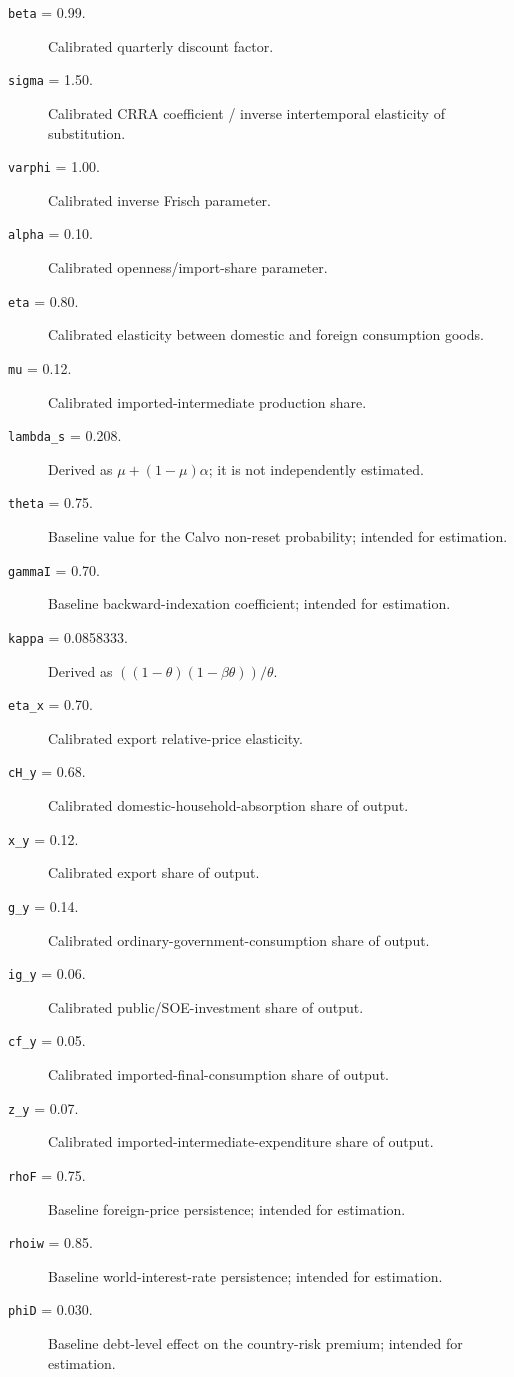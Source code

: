 \begin{description}
\item[\texttt{beta} = 0.99.] Calibrated quarterly discount factor.
\item[\texttt{sigma} = 1.50.] Calibrated CRRA coefficient / inverse intertemporal elasticity of substitution.
\item[\texttt{varphi} = 1.00.] Calibrated inverse Frisch parameter.
\item[\texttt{alpha} = 0.10.] Calibrated openness/import-share parameter.
\item[\texttt{eta} = 0.80.] Calibrated elasticity between domestic and foreign consumption goods.
\item[\texttt{mu} = 0.12.] Calibrated imported-intermediate production share.
\item[\texttt{lambda\_s} = 0.208.] Derived as \(\mu+(1-\mu)\alpha\); it is not independently estimated.
\item[\texttt{theta} = 0.75.] Baseline value for the Calvo non-reset probability; intended for estimation.
\item[\texttt{gammaI} = 0.70.] Baseline backward-indexation coefficient; intended for estimation.
\item[\texttt{kappa} = 0.0858333.] Derived as \(((1-\theta)(1-\beta\theta))/\theta\).
\item[\texttt{eta\_x} = 0.70.] Calibrated export relative-price elasticity.
\item[\texttt{cH\_y} = 0.68.] Calibrated domestic-household-absorption share of output.
\item[\texttt{x\_y} = 0.12.] Calibrated export share of output.
\item[\texttt{g\_y} = 0.14.] Calibrated ordinary-government-consumption share of output.
\item[\texttt{ig\_y} = 0.06.] Calibrated public/SOE-investment share of output.
\item[\texttt{cf\_y} = 0.05.] Calibrated imported-final-consumption share of output.
\item[\texttt{z\_y} = 0.07.] Calibrated imported-intermediate-expenditure share of output.
\item[\texttt{rhoF} = 0.75.] Baseline foreign-price persistence; intended for estimation.
\item[\texttt{rhoiw} = 0.85.] Baseline world-interest-rate persistence; intended for estimation.
\item[\texttt{phiD} = 0.030.] Baseline debt-level effect on the country-risk premium; intended for estimation.

\end{description}
